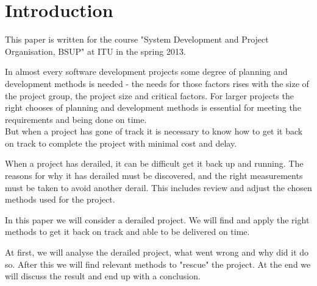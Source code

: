 \section{Introduction}
This paper is written for the course "System Development and Project Organisation, BSUP" at ITU in the spring 2013.

In almost every software development projects some degree of planning and development methods is needed - the needs for those factors rises with the size of the project group, the project size and critical factors. For larger projects the right chooses of planning and development methods is essential for meeting the requirements and being done on time.\\
But when a project has gone of track it is necessary to know how to get it back on track to complete the project with minimal cost and delay.

When a project has derailed, it can be difficult get it back up and running. The reasons for why it has derailed must be discovered, and the right measurements must be taken to avoid another derail. This includes review and adjust the chosen methods used for the project.

In this paper we will consider a derailed project. We will find and apply the right methods to get it back on track and able to be delivered on time.

At first, we will analyse the derailed project, what went wrong and why did it do so. After this we will find relevant methods to "rescue" the project. At the end we will discuss the result and end up with a conclusion.
\newpage